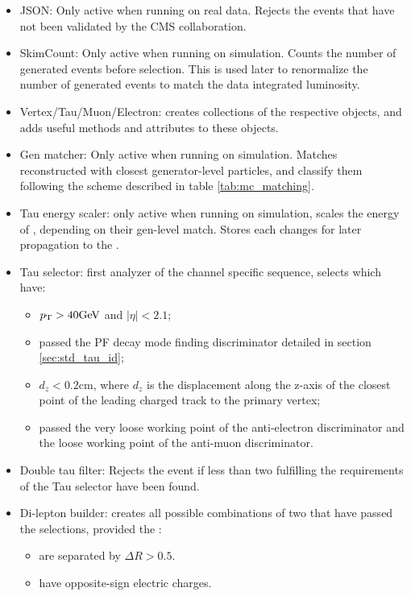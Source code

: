 \begin{itemize}
    \item JSON: Only active when running on real data. Rejects the events that have not been validated by the CMS collaboration.
    \item SkimCount: Only active when running on simulation. Counts the number of generated events before selection. This is used later to renormalize the number of generated events to match the data integrated luminosity.
    \item Vertex/Tau/Muon/Electron: creates collections of the respective objects, and adds useful methods and attributes to these objects.
    \item Gen matcher: Only active when running on simulation. Matches reconstructed \tauh with closest generator-level particles, and classify them following the scheme described in table \ref{tab:mc_matching}.
    \item Tau energy scaler: only active when running on simulation, scales the energy of \tauh, depending on their gen-level match. Stores each changes for later propagation to the \MET.
    \item Tau selector: first analyzer of the channel specific sequence, selects \tauh which have:
    \begin{itemize}
    \item $p_{\mathrm{T}} > 40 \mathrm{GeV}$ and $|\eta| < 2.1$;
    \item passed the PF decay mode finding discriminator detailed in section \ref{sec:std_tau_id};
    \item $d_z < 0.2 \mathrm{cm}$, where $d_z$ is the displacement along the z-axis of the closest point of the leading charged track to the primary vertex;
    \item passed the very loose working point of the anti-electron discriminator and the loose working point of the anti-muon discriminator.
    \end{itemize}
    \item Double tau filter: Rejects the event if less than two \tauh fulfilling the requirements of the Tau selector have been found.
    \item Di-lepton builder: creates all possible combinations of two \tauh that have passed the selections, provided the \tauh:
    \begin{itemize}
    \item are separated by $\Delta R > 0.5$.
    \item have opposite-sign electric charges.
    \end{itemize}

\end{itemize}
